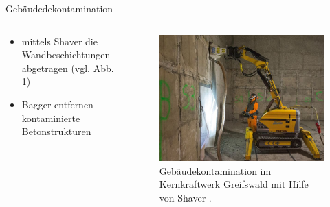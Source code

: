 \begin{frame}{Gebäudedekontamination}
  \begin{columns}

    \begin{column}{0.48\textwidth}
      \begin{itemize}
        \setlength\itemsep{1.2em}
        \item{ mittels Shaver die Wandbeschichtungen abgetragen (vgl. Abb. \ref{fig: gebaeudekontamination})}
        \item {Bagger entfernen kontaminierte Betonstrukturen }
      \end{itemize}
    \end{column}

    \begin{column}{0.48\textwidth}
      \begin{figure}
         \centering
         \includegraphics[width=1\textwidth]{./bilder/gebaeudedekontamination.png}
         \caption{Gebäudekontamination im Kernkraftwerk Greifswald mit Hilfe von Shaver \cite{gebauededekontamination}. }
         \label{fig: gebaeudekontamination}
       \end{figure}
    \end{column}

  \end{columns}
\end{frame}



